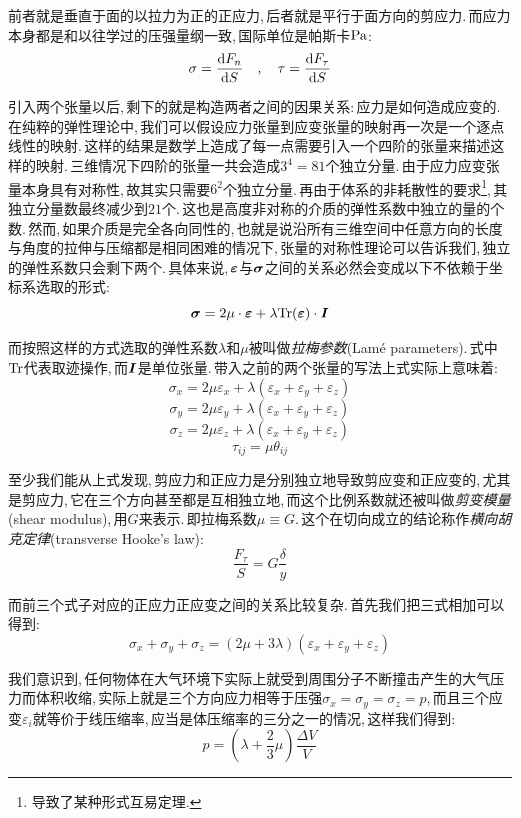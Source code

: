 前者就是垂直于面的以拉力为正的正应力,\,后者就是平行于面方向的剪应力.\,而应力本身都是和以往学过的压强量纲一致,\,国际单位是帕斯卡${\rm Pa}$:
\[\sigma=\frac{\textrm{d} F_n}{\textrm{d} S}\quad ,\quad \tau=\frac{\textrm{d} F_{\tau}}{\textrm{d} S}\]

\vspace{0.5cm}

引入两个张量以后,\,剩下的就是构造两者之间的因果关系:\,应力是如何造成应变的.\,在纯粹的弹性理论中,\,我们可以假设应力张量到应变张量的映射再一次是一个逐点线性的映射.\,这样的结果是数学上造成了每一点需要引入一个四阶的张量来描述这样的映射.\,三维情况下四阶的张量一共会造成$3^4=81$个独立分量.\,由于应力应变张量本身具有对称性,\,故其实只需要$6^2$个独立分量.\,再由于体系的非耗散性的要求\footnote{导致了某种形式互易定理.},\,其独立分量数最终减少到$21$个.\,这也是高度非对称的介质的弹性系数中独立的量的个数.\,然而,\,如果介质是完全各向同性的,\,也就是说沿所有三维空间中任意方向的长度与角度的拉伸与压缩都是相同困难的情况下,\,张量的对称性理论可以告诉我们,\,独立的弹性系数只会剩下两个.\,具体来说,\,$\boldsymbol{\varepsilon}$与$\boldsymbol{\sigma}$之间的关系必然会变成以下不依赖于坐标系选取的形式:
\[\boldsymbol{\sigma}=2\mu\cdot\boldsymbol{\varepsilon}+\lambda {\rm Tr}(\boldsymbol{\varepsilon})\cdot\boldsymbol{I}\]

而按照这样的方式选取的弹性系数$\lambda$和$\mu$被叫做\emph{拉梅参数}(Lam\'e parameters).\,式中${\rm Tr}$代表取迹操作,\,而$\boldsymbol{I}$是单位张量.\,带入之前的两个张量的写法上式实际上意味着:
\[\sigma_x=2\mu\varepsilon_x+\lambda(\varepsilon_x+\varepsilon_y+\varepsilon_z)\]
\[\sigma_y=2\mu\varepsilon_y+\lambda(\varepsilon_x+\varepsilon_y+\varepsilon_z)\]
\[\sigma_z=2\mu\varepsilon_z+\lambda(\varepsilon_x+\varepsilon_y+\varepsilon_z)\]
\[\tau_{ij}=\mu\theta_{ij}\]

至少我们能从上式发现,\,剪应力和正应力是分别独立地导致剪应变和正应变的,\,尤其是剪应力,\,它在三个方向甚至都是互相独立地,\,而这个比例系数就还被叫做\emph{剪变模量}(shear modulus),\,用$G$来表示.\,即拉梅系数$\mu\equiv G$.\,这个在切向成立的结论称作\emph{横向胡克定律}(transverse Hooke's law):
\[\frac{ F_\tau}{ S}=G \frac{ \delta}{ y}\]

而前三个式子对应的正应力正应变之间的关系比较复杂.\,首先我们把三式相加可以得到:
\[\sigma_x+\sigma_y+\sigma_z=(2\mu+3\lambda)(\varepsilon_x+\varepsilon_y+\varepsilon_z)\]\tabularnewline

我们意识到,\,任何物体在大气环境下实际上就受到周围分子不断撞击产生的大气压力而体积收缩,\,实际上就是三个方向应力相等于压强$\sigma_x=\sigma_y=\sigma_z=p$,\,而且三个应变$\varepsilon_i$就等价于线压缩率,\,应当是体压缩率的三分之一的情况,\,这样我们得到:
\[p=\left(\lambda+\frac{2}{3}\mu\right)\frac{\Delta V}{V}\]

